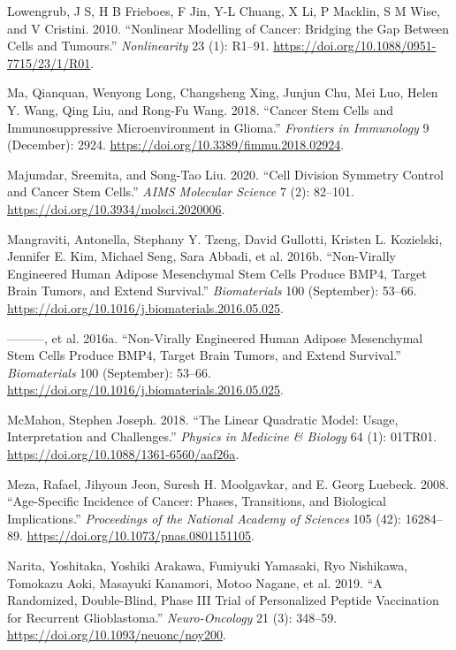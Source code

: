 \documentclass[
  letterpaper,
]{scrreprt}
\newlength{\cslhangindent}
\newenvironment{CSLReferences}[2] %
 {\begin{list}{}{%
  \setlength{\itemindent}{0pt}
  \setlength{\leftmargin}{0pt}
  \setlength{\parsep}{0pt}
  \ifodd #1
   \setlength{\leftmargin}{\cslhangindent}
   \setlength{\itemindent}{-1\cslhangindent}
  \fi
  \setlength{\itemsep}{#2\baselineskip}}}
 {\end{list}}
\theoremstyle{definition}
\theoremstyle{remark}
\begin{document}
\begin{CSLReferences}{1}{0}
Lowengrub, J S, H B Frieboes, F Jin, Y-L Chuang, X Li, P Macklin, S M
Wise, and V Cristini. 2010. {``Nonlinear Modelling of Cancer: Bridging
the Gap Between Cells and Tumours.''} \emph{Nonlinearity} 23 (1):
R1--91. \url{https://doi.org/10.1088/0951-7715/23/1/R01}.

Ma, Qianquan, Wenyong Long, Changsheng Xing, Junjun Chu, Mei Luo, Helen
Y. Wang, Qing Liu, and Rong-Fu Wang. 2018. {``Cancer Stem Cells and
Immunosuppressive Microenvironment in Glioma.''} \emph{Frontiers in
Immunology} 9 (December): 2924.
\url{https://doi.org/10.3389/fimmu.2018.02924}.

Majumdar, Sreemita, and Song-Tao Liu. 2020. {``Cell Division Symmetry
Control and Cancer Stem Cells.''} \emph{AIMS Molecular Science} 7 (2):
82--101. \url{https://doi.org/10.3934/molsci.2020006}.

Mangraviti, Antonella, Stephany Y. Tzeng, David Gullotti, Kristen L.
Kozielski, Jennifer E. Kim, Michael Seng, Sara Abbadi, et al. 2016b.
{``Non-Virally Engineered Human Adipose Mesenchymal Stem Cells Produce
BMP4, Target Brain Tumors, and Extend Survival.''} \emph{Biomaterials}
100 (September): 53--66.
\url{https://doi.org/10.1016/j.biomaterials.2016.05.025}.

---------, et al. 2016a. {``Non-Virally Engineered Human Adipose
Mesenchymal Stem Cells Produce BMP4, Target Brain Tumors, and Extend
Survival.''} \emph{Biomaterials} 100 (September): 53--66.
\url{https://doi.org/10.1016/j.biomaterials.2016.05.025}.

McMahon, Stephen Joseph. 2018. {``The Linear Quadratic Model: Usage,
Interpretation and Challenges.''} \emph{Physics in Medicine \& Biology}
64 (1): 01TR01. \url{https://doi.org/10.1088/1361-6560/aaf26a}.

Meza, Rafael, Jihyoun Jeon, Suresh H. Moolgavkar, and E. Georg Luebeck.
2008. {``Age-Specific Incidence of Cancer: Phases, Transitions, and
Biological Implications.''} \emph{Proceedings of the National Academy of
Sciences} 105 (42): 16284--89.
\url{https://doi.org/10.1073/pnas.0801151105}.

Narita, Yoshitaka, Yoshiki Arakawa, Fumiyuki Yamasaki, Ryo Nishikawa,
Tomokazu Aoki, Masayuki Kanamori, Motoo Nagane, et al. 2019. {``A
Randomized, Double-Blind, Phase III Trial of Personalized Peptide
Vaccination for Recurrent Glioblastoma.''} \emph{Neuro-Oncology} 21 (3):
348--59. \url{https://doi.org/10.1093/neuonc/noy200}.


\end{CSLReferences}
\end{document}
